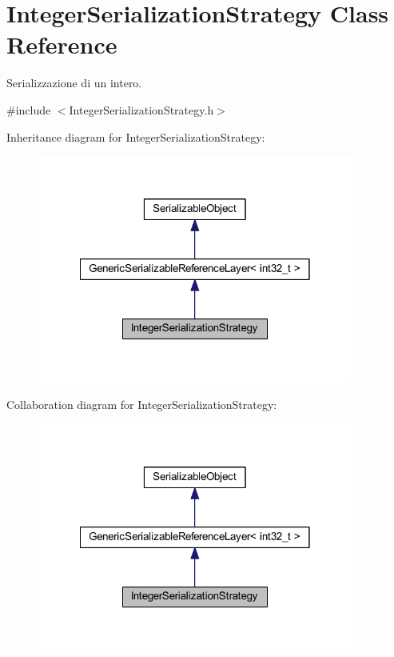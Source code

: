 \hypertarget{class_integer_serialization_strategy}{
\section{IntegerSerializationStrategy Class Reference}
\label{class_integer_serialization_strategy}
}


Serializzazione di un intero.  




{\ttfamily \#include $<$IntegerSerializationStrategy.h$>$}



Inheritance diagram for IntegerSerializationStrategy:\nopagebreak
\begin{figure}[H]
\begin{center}
\leavevmode
\includegraphics[width=294pt]{class_integer_serialization_strategy__inherit__graph}
\end{center}
\end{figure}


Collaboration diagram for IntegerSerializationStrategy:\nopagebreak
\begin{figure}[H]
\begin{center}
\leavevmode
\includegraphics[width=294pt]{class_integer_serialization_strategy__coll__graph}
\end{center}
\end{figure}
